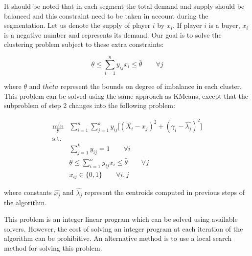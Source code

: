 \documentclass{scrartcl}
\begin{document}
\begin{multicols*}{2}
It should be noted that in each segment the total
demand and supply should be balanced and this constraint
need to be taken in account during the segmentation. Let us denote the supply of player $i$ by $x_i$. If player $i$ is a buyer, $x_i$ is a negative number and represents its demand. Our goal is to solve the clustering problem subject to these extra constraints:

\begin{equation}
	\underline{\theta} \leq \sum_{i=1}^{n} y_{ij} x_i \leq \bar{\theta} \qquad \forall j 
\end{equation}

where $\underline{\theta}$ and $\bar{theta}$ represent the bounds on degree of imbalance in each cluster. This problem can be solved using the same approach as KMeans, except that the subproblem of step 2 changes into the following problem:

\begin{align*}
\min_{\mathbf{y}} & \sum_{i=1}^{n} \sum_{j=1}^{k} y_{ij} \big[ (\bar{X_i} - \hat{x_j})^2 + (\gamma_i - \hat{\lambda_j})^2 \big] \\
\text{s.t.} & \\
& \sum_{j=1}^k y_{ij} = 1 \qquad \forall i \\
& \underline{\theta} \leq \sum_{i=1}^{n} y_{ij} x_i \leq \bar{\theta} \qquad \forall j \\
& x_{ij} \in \{0, 1\} \qquad \forall i, j
\end{align*}

where constants $\hat{x_j}$ and $\hat{\lambda_j}$ represent the centroids computed in previous steps of the algorithm.

This problem is an integer linear program which can be solved using available solvers. However, the cost of solving an integer program at each iteration of the algorithm can be prohibitive. An alternative method is to use a local search method for solving this problem.  
 



\end{multicols*}
\end{document}
